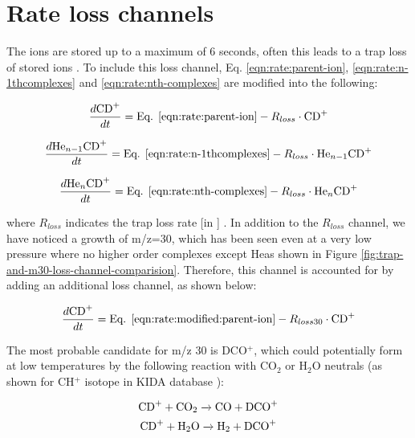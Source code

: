 \section{Rate loss channels}
\label{subsec:rate-loss-channels}

The ions are stored up to a maximum of 6 seconds, often this leads to a trap loss of stored ions \cite{mikosch_evaporation_2007, mikosch_evaporation_2008}. To include this loss channel, Eq. \ref{eqn:rate:parent-ion}, \ref{eqn:rate:n-1thcomplexes} and \ref{eqn:rate:nth-complexes} are modified into the following:

\begin{equation}
    \frac{d\text{CD}^+}{dt} = \text{Eq. } \ref{eqn:rate:parent-ion} - R_{loss} \cdot \text{CD}^+
    \label{eqn:rate:modified:parent-ion}
\end{equation}

\begin{equation}
    \frac{d\text{He}_{n-1}\text{CD}^+}{dt} = \text{Eq. } \ref{eqn:rate:n-1thcomplexes} - R_{loss} \cdot \text{He}_{n-1}\text{CD}^+
    \label{eqn:rate:modified:n-1complexes}
\end{equation}

\begin{equation}
    \frac{d\text{He}_{n}\text{CD}^+}{dt} = \text{Eq. } \ref{eqn:rate:nth-complexes} - R_{loss} \cdot \text{He}_{n}\text{CD}^+
    \label{eqn:rate:modified:nth-complexes}
\end{equation}

where $R_{loss}$ indicates the trap loss rate [in \pers] . In addition to the
$R_{loss}$ channel, we have noticed a growth of m/z=30, which has been seen
even at a very low pressure where no higher order complexes except He\CD as
shown in Figure \ref{fig:trap-and-m30-loss-channel-comparision}. Therefore,
this channel is accounted for by adding an additional loss channel, as shown
below:

\begin{equation}
    \frac{d\text{CD}^+}{dt} = \text{Eq. } \ref{eqn:rate:modified:parent-ion} - R_{loss30} \cdot \text{CD}^+
    \label{eqn:rate:parent-ion-mass30-loss}
\end{equation}

The most probable candidate for m/z 30 is DCO$^+$, which could potentially form
at low temperatures by the following reaction with CO$_2$ or H$_2$O neutrals
(as shown for CH$^+$ isotope in KIDA database \cite{wakelam_2014_2015}):

\begin{equation}
    \text{CD}^+ + \text{CO}_2 \xrightarrow{} \text{CO} + \text{DCO}^+
    \label{eqn:mass-30-reaction-with-CO2}
\end{equation}
\begin{equation}
    \text{CD}^+ + \text{H$_2$O} \xrightarrow{} \text{H$_2$} + \text{DCO}^+
    \label{eqn:mass-30-reaction-with-water}
\end{equation}


